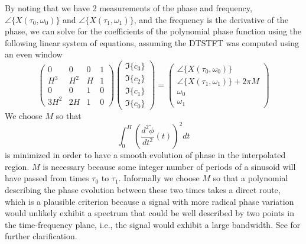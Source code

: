 By noting that we have 2 measurements of the phase and frequency,
$\angle\{X(\tau_0,\omega_0)\}$ and $\angle\{X(\tau_1,\omega_1)\}$, and the frequency
is the derivative of the phase, we can solve for the coefficients of the
polynomial phase function using the following linear system of equations,
assuming the DTSTFT was computed using an even window
\begin{equation}
    \begin{pmatrix}
        0   & 0     & 0 & 1 \\
        H^3 & H^2   & H & 1 \\
        0   & 0     & 1 & 0 \\
        3 H^2 & 2 H & 1 & 0
    \end{pmatrix}
    \begin{pmatrix}
        \Im\{c_3\} \\
        \Im\{c_2\} \\
        \Im\{c_1\} \\
        \Im\{c_0\}
    \end{pmatrix}
    =
    \begin{pmatrix}
        \angle\{X(\tau_0,\omega_0)\} \\
        \angle\{X(\tau_1,\omega_1)\} + 2 \pi M \\
        \omega_0 \\
        \omega_1        
    \end{pmatrix}
\end{equation}
We choose $M$ so that
\begin{equation}
    \label{eq:minfmmq}
    \int_{0}^{H}(\frac{d^{2}\tilde{\phi}}{dt^2}(t))^{2}dt
\end{equation}
is minimized in order to have a smooth evolution of phase in the interpolated
region. $M$ is necessary because some integer number of periods of a sinusoid
will have passed from times $\tau_{0}$ to $\tau_{1}$. Informally we choose $M$
so that a polynomial describing the phase evolution between these two times
takes a direct route, which is a plausible criterion because a signal with more
radical phase variation would unlikely exhibit a spectrum that could be well
described by two points in the time-frequency plane, i.e., the signal
would exhibit a large bandwidth. See \cite[p.~751]{mcaulay1986speech} for
further clarification.

